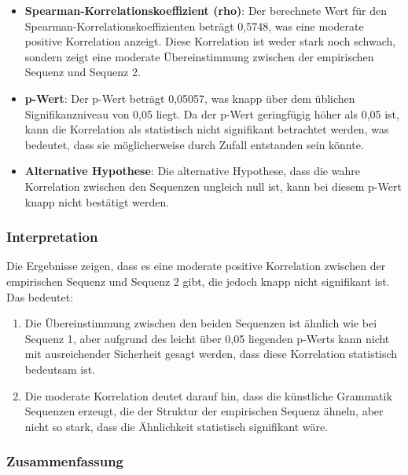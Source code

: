 \documentclass[
]{article}
\begin{document}
\begin{itemize}
\item
  \textbf{Spearman-Korrelationskoeffizient (rho)}: Der berechnete Wert
  für den Spearman-Korrelationskoeffizienten beträgt 0,5748, was eine
  moderate positive Korrelation anzeigt. Diese Korrelation ist weder
  stark noch schwach, sondern zeigt eine moderate Übereinstimmung
  zwischen der empirischen Sequenz und Sequenz 2.
\item
  \textbf{p-Wert}: Der p-Wert beträgt 0,05057, was knapp über dem
  üblichen Signifikanzniveau von 0,05 liegt. Da der p-Wert geringfügig
  höher als 0,05 ist, kann die Korrelation als statistisch nicht
  signifikant betrachtet werden, was bedeutet, dass sie möglicherweise
  durch Zufall entstanden sein könnte.
\item
  \textbf{Alternative Hypothese}: Die alternative Hypothese, dass die
  wahre Korrelation zwischen den Sequenzen ungleich null ist, kann bei
  diesem p-Wert knapp nicht bestätigt werden.
\end{itemize}

\subsubsection{\texorpdfstring{\textbf{Interpretation}}{Interpretation}}\label{interpretation}

Die Ergebnisse zeigen, dass es eine moderate positive Korrelation
zwischen der empirischen Sequenz und Sequenz 2 gibt, die jedoch knapp
nicht signifikant ist. Das bedeutet:

\begin{enumerate}
\def\labelenumi{\arabic{enumi}.}
\item
  Die Übereinstimmung zwischen den beiden Sequenzen ist ähnlich wie bei
  Sequenz 1, aber aufgrund des leicht über 0,05 liegenden p-Werts kann
  nicht mit ausreichender Sicherheit gesagt werden, dass diese
  Korrelation statistisch bedeutsam ist.
\item
  Die moderate Korrelation deutet darauf hin, dass die künstliche
  Grammatik Sequenzen erzeugt, die der Struktur der empirischen Sequenz
  ähneln, aber nicht so stark, dass die Ähnlichkeit statistisch
  signifikant wäre.
\end{enumerate}

\subsubsection{\texorpdfstring{\textbf{Zusammenfassung}}{Zusammenfassung}}\label{zusammenfassung}
\end{document}
